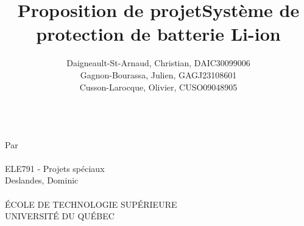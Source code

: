 

\title{Proposition de projet}
\title{Système de protection de batterie Li-ion}
\author{
	Daigneault-St-Arnaud, Christian, DAIC30099006 \\
	Gagnon-Bourassa, Julien, GAGJ23108601 \\
	Cusson-Larocque, Olivier, CUSO09048905
}
\newcommand{\cours}{ELE791 - Projets sp\'{e}ciaux }
\newcommand{\prof}{Deslandes, Dominic}



\makeatletter
\begin{titlepage}
	\begin{center}
	{\Huge \@title}\\ 
	\vspace{3cm}
	{\large Par \\
		\vspace{0.5cm}
		\@author \\
		\vspace{3cm}
		\cours \\
		\vspace{0.5cm}
		\prof \\
		\vspace{3.5cm}
		\@date \\
		\vspace{3.5cm}
		\'{E}COLE DE TECHNOLOGIE SUP\'{E}RIEURE \\
		UNIVERSIT\'{E} DU QUÉBEC
	}		
	\end{center}
\end{titlepage}
\makeatother




